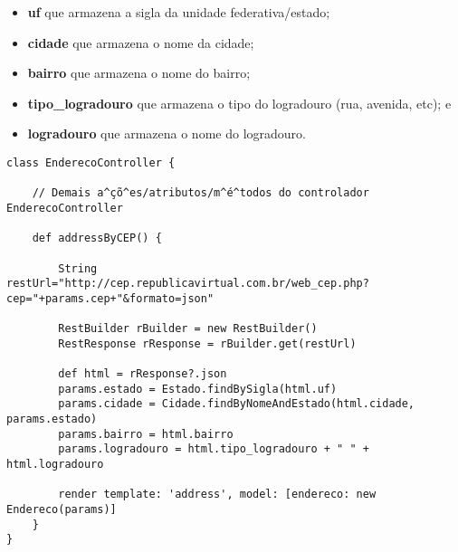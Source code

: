 \vspace{0.3cm}

\begin{itemize}

\item {\bf uf} que armazena a sigla da unidade federativa/estado;

\vspace{0.3cm}

\item {\bf cidade} que armazena o nome da cidade;

\vspace{0.3cm}

\item {\bf bairro} que armazena o nome do bairro;

\vspace{0.3cm}

\item {\bf  tipo\_logradouro} que armazena  o tipo do logradouro  (rua, avenida,
  etc); e

\vspace{0.3cm}

\item {\bf logradouro} que armazena o nome do logradouro.

\end{itemize}

\begin{lstlisting}[caption=Controlador  {\bf EnderecoController}, frame  = trBL,
    float=htbp, label=codEnderecoController] 
class EnderecoController {

    // Demais a^çõ^es/atributos/m^é^todos do controlador EnderecoController

    def addressByCEP() {

        String restUrl="http://cep.republicavirtual.com.br/web_cep.php?cep="+params.cep+"&formato=json"

        RestBuilder rBuilder = new RestBuilder()
        RestResponse rResponse = rBuilder.get(restUrl)

        def html = rResponse?.json
        params.estado = Estado.findBySigla(html.uf)
        params.cidade = Cidade.findByNomeAndEstado(html.cidade, params.estado)
        params.bairro = html.bairro
        params.logradouro = html.tipo_logradouro + " " + html.logradouro

        render template: 'address', model: [endereco: new Endereco(params)]
    }
}
\end{lstlisting}

\vspace{0.3cm}

